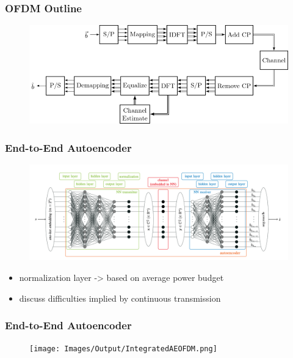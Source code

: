 \documentclass{beamer}
\begin{document}


\begin{frame}[label=OFDM]
	\frametitle{OFDM Outline}
	\begin{figure}
			\centering
		\includegraphics[scale=.4]{Images/Output/ofdm.png}
	\end{figure}
\end{frame}


\begin{frame}[squeeze]
	\frametitle{End-to-End Autoencoder}
	\begin{figure}[t]
		\includegraphics[scale=.3]{Images/endtoend.png}
		\centering
		\caption{\cite{felix2018ofdm}}
	\end{figure}
	\centering
	\begin{itemize}
		\item normalization layer -> based on average power budget
		\item discuss difficulties implied by continuous transmission
	\end{itemize}
\end{frame}


\begin{frame}[squeeze]
	\frametitle{End-to-End Autoencoder}
	\begin{figure}[t]
		\texttt{[image: Images/Output/IntegratedAEOFDM.png]}
		\centering
		\caption{\cite{felix2018ofdm}}
	\end{figure}
\end{frame}
\end{document}
